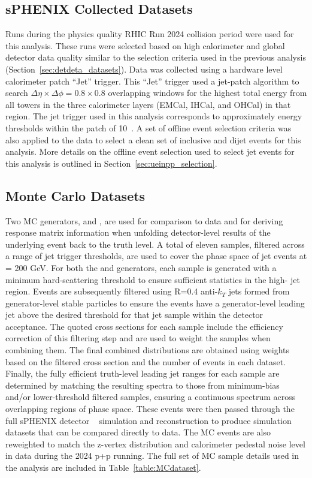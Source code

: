 \subsection{sPHENIX Collected Datasets}
Runs during the physics quality RHIC Run 2024 \pp collision period were used for this analysis. 
These runs were selected based on high calorimeter and global detector data quality similar to the selection criteria used in the previous analysis (Section~\ref{sec:detdeta_datasets}).
Data was collected using a hardware level calorimeter patch ``Jet'' trigger.
This ``Jet'' trigger used a jet-patch algorithm to search $\Delta\eta \times \Delta\phi = 0.8 \times 0.8$ overlapping windows for the highest total energy from all towers in the three calorimeter layers (EMCal, IHCal, and OHCal) in that region. 
The jet trigger used in this analysis corresponds to approximately energy thresholds within the patch of 10~\GeV.
A set of offline event selection criteria was also applied to the data to select a clean set of inclusive and dijet events for this analysis.
More details on the offline event selection used to select jet events for this analysis is outlined in Section~\ref{sec:ueinpp_selection}.

\subsection{Monte Carlo Datasets}
\label{sec:mc_samples}
Two MC generators, \pythia and \herwig, are used for comparison to data and for deriving response matrix information when unfolding detector-level results of the underlying event back to the truth level.
A total of eleven samples, filtered across a range of jet trigger thresholds, are used to cover the phase space of \pp jet events at \snn = 200 GeV.
For both the \pythia and \herwig generators, each sample is generated with a minimum hard-scattering \pT{} threshold to ensure sufficient statistics in the high-\pT{} jet region.
Events are subsequently filtered using R=0.4 anti-$k_T$ jets formed from generator-level stable particles to ensure the events have a generator-level leading jet above the desired \pT{} threshold for that jet sample within the detector acceptance.
The quoted cross sections for each sample include the efficiency correction of this filtering step and are used to weight the samples when combining them.
The final combined distributions are obtained using weights based on the filtered cross section and the number of events in each dataset.
Finally, the fully efficient truth-level leading jet \pT{} ranges for each sample are determined by matching the resulting spectra to those from minimum-bias and/or lower-threshold filtered samples, ensuring a continuous spectrum across overlapping regions of phase space. 
These events were then passed through the full sPHENIX detector \geant~\cite{GEANT4} simulation and reconstruction to produce simulation datasets that can be compared directly to data.
The MC events are also reweighted to match the z-vertex distribution and calorimeter pedestal noise level in data during the 2024 p+p running. 
The full set of MC sample details used in the analysis are included in Table~\ref{table:MCdataset}.

